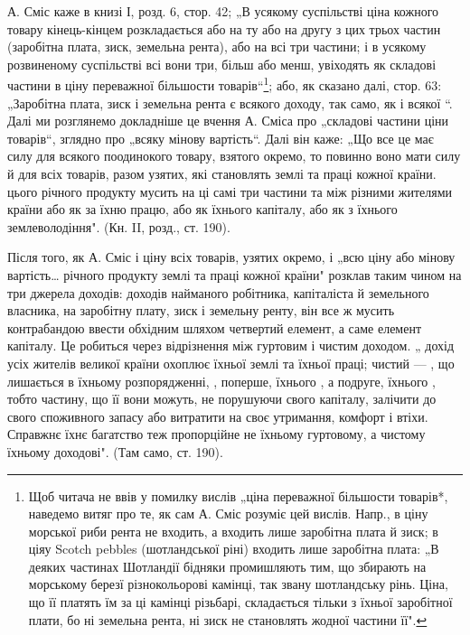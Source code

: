 А. Сміс каже в книзі І, розд. 6, стор. 42; „В усякому суспільстві
ціна кожного товару кінець-кінцем розкладається або на ту або на другу
з цих трьох частин (заробітна плата, зиск, земельна рента), або на всі
три частини; і в усякому розвиненому суспільстві всі вони три, більш
або менш, увіходять як складові частини в ціну переважної більшости
товарів“\footnote{
Щоб читача не ввів у помилку вислів „ціна переважної більшости товарів*,
наведемо витяг про те, як сам А. Сміс розуміє цей вислів. Напр., в ціну морської
риби рента не входить, а входить лише заробітна плата й зиск; в ціяу Scotch
pebbles (шотландської ріні) входить лише заробітна плата: „В деяких частинах
Шотландії бідняки промишляють тим, що збирають на морському березї різнокольорові
камінці, так звану шотландську рінь. Ціна, що її платять їм за ці камінці
різьбарі, складається тільки з їхньої заробітної плати, бо ні земельна рента, ні
зиск не становлять жодної частини її".
}; або, як сказано далі, стор. 63: „Заробітна плата, зиск і земельна
рента є  всякого доходу, так само,
як і всякої “. Далі ми розглянемо докладніше це
вчення А. Сміса про „складові частини ціни товарів“, зглядно про „всяку
мінову вартість“. Далі він каже: „Що все це має силу для всякого
поодинокого товару, взятого окремо, то повинно воно мати силу й для
всіх товарів, разом узятих, які становлять 
землі та праці кожної країни. 
цього річного продукту мусить  на ці самі три частини
та  між різними жителями країни або як  за
їхню працю, або як  їхнього капіталу, або як  з їхнього
землеволодіння". (Кн. II, розд., ст. 190).

Після того, як А. Сміс і ціну всіх товарів, узятих окремо, і „всю ціну
або мінову вартість\dots{} річного продукту землі та праці кожної країни"
розклав таким чином на три джерела доходів: доходів найманого робітника,
капіталіста й земельного власника, на заробітну плату, зиск і земельну
ренту, він все ж мусить контрабандою ввести обхідним шляхом
четвертий елемент, а саме елемент капіталу. Це робиться через відрізнення
між гуртовим і чистим доходом. „ дохід усіх жителів великої
країни охоплює  їхньої землі та їхньої праці;
чистий  — , що лишається в їхньому розпорядженні,
, поперше, їхнього ,
а подруге, їхнього , тобто
частину, що її вони можуть, не порушуючи свого капіталу, залічити
до свого споживного запасу або витратити на своє утримання, комфорт
і втіхи. Справжнє їхнє багатство теж пропорційне не їхньому гуртовому,
а чистому їхньому доходові". (Там само, ст. 190).


